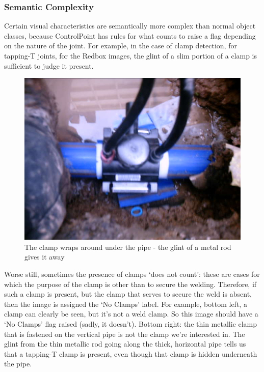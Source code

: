 \documentclass[a4paper,11pt]{article}
\begin{document}
\subsubsection{Semantic Complexity}

Certain visual characteristics are semantically more complex than normal object classes, because ControlPoint has rules for what counts to raise a flag depending on the nature of the joint. For example, in the case of clamp detection, for tapping-T joints, for the Redbox images, the glint of a slim portion of a clamp is sufficient to judge it present. \\

\begin{figure}[h!]
	\centering
	\includegraphics[width=0.35\linewidth]{images/tapping-T.jpg}
	\caption{The clamp wraps around under the pipe - the glint of a metal rod gives it away}
\end{figure}

Worse still, sometimes the presence of clamps `does not count': these are cases for which the purpose of the clamp is other than to secure the welding. Therefore, if such a clamp is present, but the clamp that serves to secure the weld is absent, then the image is assigned the `No Clamps' label. For example, bottom left, a clamp can clearly be seen, but it's not a weld clamp. So this image should have a `No Clamps' flag raised (sadly, it doesn't). Bottom right: the thin metallic clamp that is fastened on the vertical pipe is not the clamp we're interested in. The glint from the thin metallic rod going along the thick, horizontal pipe tells us that a tapping-T clamp is present, even though that clamp is hidden underneath the pipe. 
\end{document}
